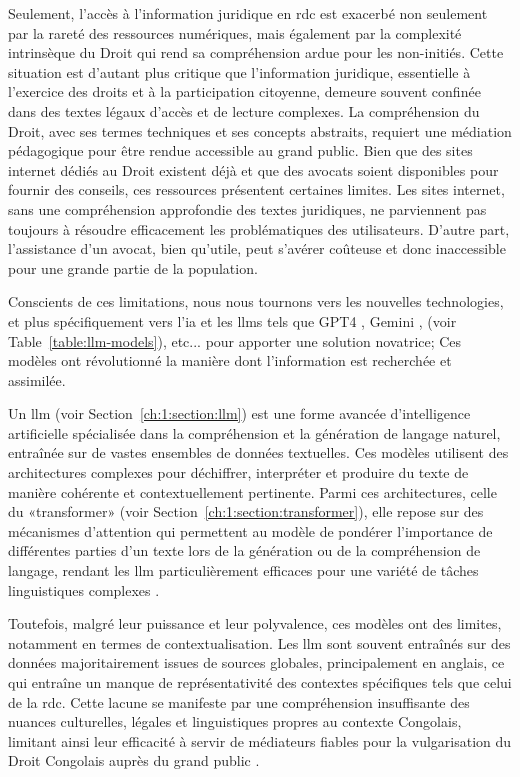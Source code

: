 Seulement, l'accès à l'information juridique en \ac{rdc} est exacerbé non seulement par la rareté des ressources numériques, mais également par la complexité intrinsèque du Droit qui rend sa compréhension ardue pour les non-initiés. Cette situation est d'autant plus critique que l'information juridique, essentielle à l'exercice des droits et à la participation citoyenne, demeure souvent confinée dans des textes légaux d'accès et de lecture complexes. La compréhension du Droit, avec ses termes techniques et ses concepts abstraits, requiert une médiation pédagogique pour être rendue accessible au grand public. Bien que des sites internet dédiés au Droit existent déjà et que des avocats soient disponibles pour fournir des conseils, ces ressources présentent certaines limites. Les sites internet, sans une compréhension approfondie des textes juridiques, ne parviennent pas toujours à résoudre efficacement les problématiques des utilisateurs. D'autre part, l'assistance d'un avocat, bien qu'utile, peut s'avérer coûteuse et donc inaccessible pour une grande partie de la population.

Conscients de ces limitations, nous nous tournons vers les nouvelles technologies, et plus spécifiquement vers l'\ac{ia} et les \acfp{llm} tels que GPT4 \cite{openai2023gpt4}, Gemini \cite{geminiteam2023gemini}, (voir Table~\ref{table:llm-models}), etc... pour apporter une solution novatrice; Ces modèles ont révolutionné la manière dont l'information est recherchée et assimilée.

Un \ac{llm} (voir Section~\ref{ch:1:section:llm}) est une forme avancée d'intelligence artificielle spécialisée dans la compréhension et la génération de langage naturel, entraînée sur de vastes ensembles de données textuelles. Ces modèles utilisent des architectures complexes pour déchiffrer, interpréter et produire du texte de manière cohérente et contextuellement pertinente. Parmi ces architectures, celle du «transformer» \cite{Rothman2022Transformers} (voir Section~\ref{ch:1:section:transformer}), elle repose sur des mécanismes d'attention qui permettent au modèle de pondérer l'importance de différentes parties d'un texte lors de la génération ou de la compréhension de langage, rendant les \ac{llm} particulièrement efficaces pour une variété de tâches linguistiques complexes \cite{vaswani2023attention}.

Toutefois, malgré leur puissance et leur polyvalence, ces modèles ont des limites, notamment en termes de contextualisation. Les \ac{llm} sont souvent entraînés sur des données majoritairement issues de sources globales, principalement en anglais, ce qui entraîne un manque de représentativité des contextes spécifiques tels que celui de la \ac{rdc}. Cette lacune se manifeste par une compréhension insuffisante des nuances culturelles, légales et linguistiques propres au contexte Congolais, limitant ainsi leur efficacité à servir de médiateurs fiables pour la vulgarisation du Droit Congolais auprès du grand public \cite{brown2020languagemodelsfewshotlearners}.


